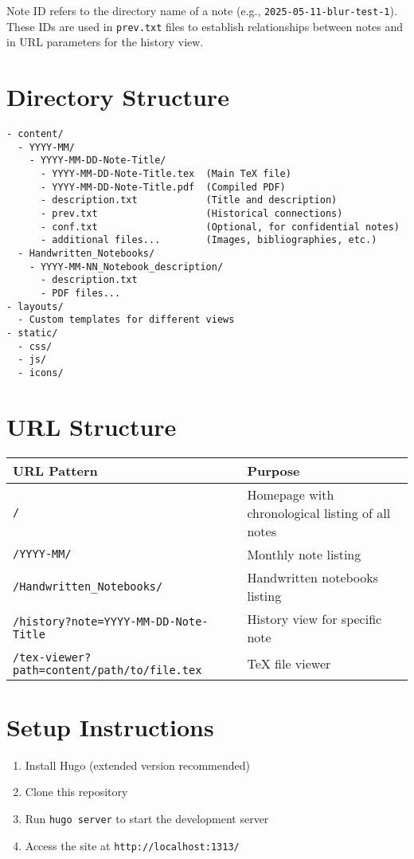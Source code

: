 \documentclass{article}
\begin{document}
Note ID refers to the directory name of a note (e.g., \texttt{2025-05-11-blur-test-1}). These IDs are used in \texttt{prev.txt} files to establish relationships between notes and in URL parameters for the history view.

\section{Directory Structure}

\begin{verbatim}
- content/
  - YYYY-MM/
    - YYYY-MM-DD-Note-Title/
      - YYYY-MM-DD-Note-Title.tex  (Main TeX file)
      - YYYY-MM-DD-Note-Title.pdf  (Compiled PDF)
      - description.txt            (Title and description)
      - prev.txt                   (Historical connections)
      - conf.txt                   (Optional, for confidential notes)
      - additional files...        (Images, bibliographies, etc.)
  - Handwritten_Notebooks/
    - YYYY-MM-NN_Notebook_description/
      - description.txt
      - PDF files...
- layouts/
  - Custom templates for different views
- static/
  - css/
  - js/
  - icons/
\end{verbatim}

\section{URL Structure}

\begin{tabular}{|l|l|}
\hline
\textbf{URL Pattern} & \textbf{Purpose} \\
\hline
\texttt{/} & Homepage with chronological listing of all notes \\
\texttt{/YYYY-MM/} & Monthly note listing \\
\texttt{/Handwritten\_Notebooks/} & Handwritten notebooks listing \\
\texttt{/history?note=YYYY-MM-DD-Note-Title} & History view for specific note \\
\texttt{/tex-viewer?path=content/path/to/file.tex} & TeX file viewer \\
\hline
\end{tabular}

\section{Setup Instructions}

\begin{enumerate}
  \item Install Hugo (extended version recommended)
  \item Clone this repository
  \item Run \texttt{hugo server} to start the development server
  \item Access the site at \texttt{http://localhost:1313/}
\end{enumerate}
\end{document}
